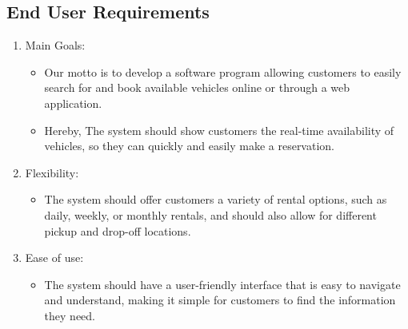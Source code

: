\subsection{End User Requirements}
\begin{enumerate}
\item Main Goals:
	\begin{itemize}
	\item Our motto is to develop a software program allowing customers to easily search for and book available vehicles online or through a web application.
	\item Hereby, The system should show customers the real-time availability of vehicles, so they can quickly and easily make a reservation.
	\end{itemize}
\item Flexibility:
	\begin{itemize}
	\item The system should offer customers a variety of rental options, such as daily, weekly, or monthly rentals, and should also allow for different pickup and drop-off locations.
	\end{itemize}		
\item Ease of use:
	\begin{itemize}
	\item The system should have a user-friendly interface that is easy to navigate and understand, making it simple for customers to find the information they need.	\end{itemize}
\end{enumerate}